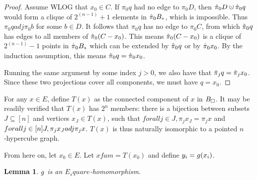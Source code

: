 \documentclass{amsart}
\newtheorem{lemma}{Lemma}
\theoremstyle{definition}
\newcommand{\cupdot}{\mathbin{\mathaccent\cdot\cup}}
\begin{document}
\begin{proof}
    Assume WLOG that $x_0 \in C$. If $\pi_0 q$ had no edge to $\pi_0 D$, then
    $\pih_0 D \cupdot {\pih_0 q}$ would form a clique of $2^(n-1)+1$ elements
    in $\hat{\pi}_0 B_*$, which is impossible. Thus $\pi_0 q adj \pi_0 b$ for some $b \in D$. It follows that $\pi_0 q$ has no edge to $\pi_0 C$, from which $\hat{\pi}_0 q$ has edges to all members of $\hat{\pi}_0 (C - {x_0})$. This means $\hat{\pi}_0 (C - {x_0})$ is a clique of $2^(n-1)-1$ points in $\hat{\pi}_0 B_*$ which can be extended by $\hat{\pi}_0 q$ or by $\hat{\pi}_0 x_0$. By the induction assumption, this means $\hat{\pi}_0 q = \hat{\pi}_0 x_0$.
    
    Running the same argument by some index $j > 0$, we also have that $\hat{\pi}_j q = \hat{\pi}_j x_0$. Since these two projections cover all components, we must have $q = x_0$.
\end{proof}


For any $x \in E$, define $T(x)$ as the connected component of $x$ in $B_\square$. It may be readily verified that $T(x)$ has $2^n$ members: there is a bijection between subsets $J \subseteq [n]$ and vertices $x_J \in T(x)$, such that $forall j \in J, \pi_j x_J = \pi_j x$ and $forall j \in [n]\\J, \pi_j x_J adj \pi_j x$. $T(x)$ is thus naturally isomorphic to a pointed $n$‑hypercube graph.

From here on, let $x_0 \in E$. Let $xfam = T(x_0)$ and define $y_i = g(x_i)$.

\begin{lemma} \label{one-component}
    $g$ is an $E_square$-homomorphism.
\end{lemma}
\end{document}
